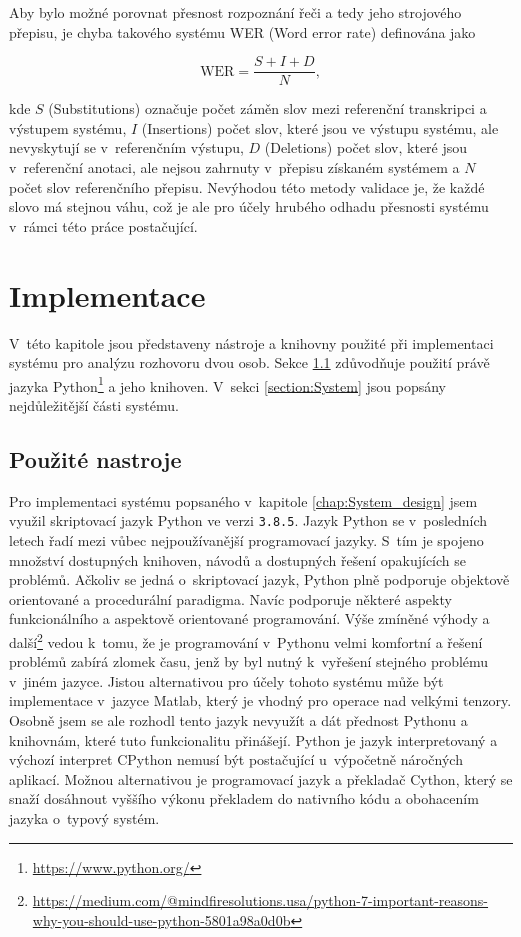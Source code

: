 Aby bylo možné porovnat přesnost rozpoznání řeči a tedy jeho strojového přepisu, je chyba takového systému WER (Word error rate) definována jako

\begin{equation}
\label{eqn:WER}
    \text{WER} = \frac{S + I + D}{N},
\end{equation}

kde $S$ (Substitutions) označuje počet záměn slov mezi referenční transkripci a výstupem systému, $I$ (Insertions) počet slov, které jsou ve výstupu systému, ale nevyskytují se v~referenčním výstupu, $D$ (Deletions) počet slov, které jsou v~referenční anotaci, ale nejsou zahrnuty v~přepisu získaném systémem a $N$ počet slov referenčního přepisu. Nevýhodou této metody validace je, že každé slovo má stejnou váhu, což je ale pro účely hrubého odhadu přesnosti systému v~rámci této práce postačující.


\chapter{Implementace}
\label{chap:Implementation}
V~této kapitole jsou představeny nástroje a knihovny použité při implementaci systému pro analýzu rozhovoru dvou osob. Sekce \ref{section:Toolset} zdůvodňuje použití právě jazyka Python\footnote{\url{https://www.python.org/}} a jeho knihoven. V~sekci \ref{section:System} jsou popsány nejdůležitější části systému.  

\section{Použité nastroje}
\label{section:Toolset}
Pro implementaci systému popsaného v~kapitole \ref{chap:System_design} jsem využil skriptovací jazyk Python ve verzi \texttt{3.8.5}. Jazyk Python se v~posledních letech řadí mezi vůbec nejpoužívanější programovací jazyky. S~tím je spojeno množství dostupných knihoven, návodů a dostupných řešení opakujících se problémů. Ačkoliv se jedná o~skriptovací jazyk, Python plně podporuje objektově orientované a procedurální paradigma. Navíc podporuje některé aspekty funkcionálního a aspektově orientované programování. Výše zmíněné výhody a další\footnote{\url{https://medium.com/@mindfiresolutions.usa/python-7-important-reasons-why-you-should-use-python-5801a98a0d0b}} vedou k~tomu, že je programování v~Pythonu velmi komfortní a řešení problémů zabírá zlomek času, jenž by byl nutný k~vyřešení stejného problému v~jiném jazyce. Jistou alternativou pro účely tohoto systému může být implementace v~jazyce Matlab, který je vhodný pro operace nad velkými tenzory. Osobně jsem se ale rozhodl tento jazyk nevyužít a dát přednost Pythonu a knihovnám, které tuto funkcionalitu přinášejí. Python je jazyk interpretovaný a výchozí interpret CPython nemusí být postačující u~výpočetně náročných aplikací. Možnou alternativou je programovací jazyk a překladač Cython, který se snaží dosáhnout vyššího výkonu překladem do nativního kódu a obohacením jazyka o~typový systém.

